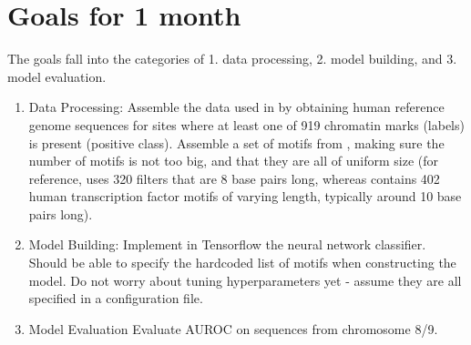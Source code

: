 \documentclass[11pt]{amsart}
\begin{document}
\section{Goals for 1 month}
The goals fall into the categories of 1. data processing, 2. model building, and 3. model evaluation.
\begin{enumerate}
\item Data Processing: Assemble the data used in \cite{zhou2015predicting} by obtaining human reference genome sequences for sites where at least one of 919 chromatin marks (labels) is present (positive class).  Assemble a set of motifs from \cite{doi:10.1093/nar/gkx1106}, making sure the number of motifs is not too big, and that they are all of uniform size (for reference, \cite{zhou2015predicting} uses 320 filters that are 8 base pairs long, whereas \cite{doi:10.1093/nar/gkx1106} contains 402 human transcription factor motifs of varying length, typically around 10 base pairs long).
\item Model Building: Implement in Tensorflow the neural network classifier.  Should be able to specify the hardcoded list of motifs when constructing the model.  Do not worry about tuning hyperparameters yet - assume they are all specified in a configuration file.
\item Model Evaluation Evaluate AUROC on sequences from chromosome 8/9.
\end{enumerate}



\end{document}

